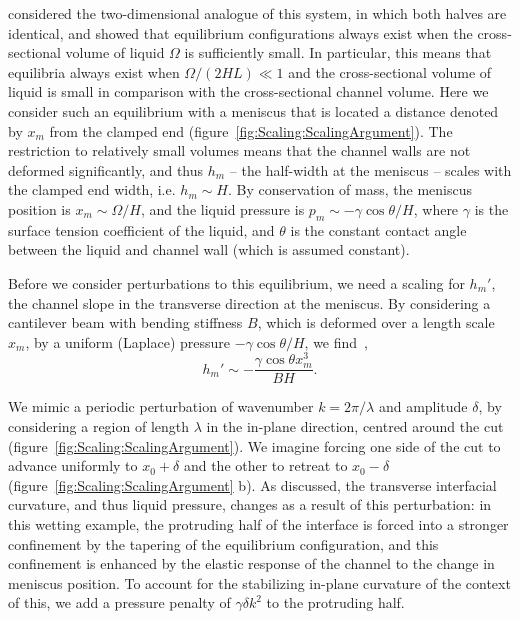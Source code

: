 \documentclass{jfm}
\newcommand{\amplitude}{\delta} %
\begin{document}
\citet{Taroni2012JFM} considered the two-dimensional analogue of this system, in which both halves are identical, and showed that equilibrium configurations always exist when the cross-sectional volume of liquid $\Omega$ is sufficiently small. In particular, this means that equilibria always exist when $\Omega / (2HL) \ll 1$ and the cross-sectional volume of liquid is small in comparison with the cross-sectional channel volume. Here we consider such an equilibrium with a meniscus that is located a distance denoted by $x_m$ from the clamped end (figure~\ref{fig:Scaling:ScalingArgument}). The restriction to relatively small volumes means that the channel walls are not deformed significantly, and thus $h_m$ -- the half-width at the meniscus -- scales with the clamped end width, i.e. $h_m \sim H$. By conservation of mass, the meniscus position is $x_m \sim \Omega / H$, and the liquid pressure is $p_m \sim -\gamma \cos \theta/H$, where $\gamma$ is the surface tension coefficient of the liquid, and $\theta$ is the constant contact angle between the liquid and channel wall (which is assumed constant).

Before we consider perturbations to this equilibrium, we need a scaling for $h_m'$, the channel slope in the transverse direction at the meniscus. By considering a cantilever beam with bending stiffness $B$, which is deformed over a length scale $x_m$, by a uniform (Laplace) pressure $-\gamma \cos \theta / H$, we find~\citep{Timoshenko1959},
\begin{equation}\label{E:Scaling:hmprimed}
h_m' \sim -\frac{\gamma \cos \theta x_m^3}{B H}.
\end{equation}

We mimic a periodic perturbation of wavenumber $k = 2\pi/\lambda$ and amplitude $\amplitude$, by considering a region of length $\lambda$ in the in-plane direction, centred around the cut (figure~\ref{fig:Scaling:ScalingArgument}). We imagine forcing one side of the cut to advance uniformly to $x_0 + \amplitude$ and the other to retreat to $x_0 - \amplitude$ (figure~\ref{fig:Scaling:ScalingArgument} b). As discussed, the transverse interfacial curvature, and thus liquid pressure, changes as a result of this perturbation: in this wetting example, the protruding half of the interface is forced into a stronger confinement by the tapering of the equilibrium configuration, and this confinement is enhanced by the elastic response of the channel to the change in meniscus position. To account for the stabilizing in-plane curvature of the context of this, we add a pressure penalty of $\gamma \delta k^2$ to the protruding half.
\end{document}
